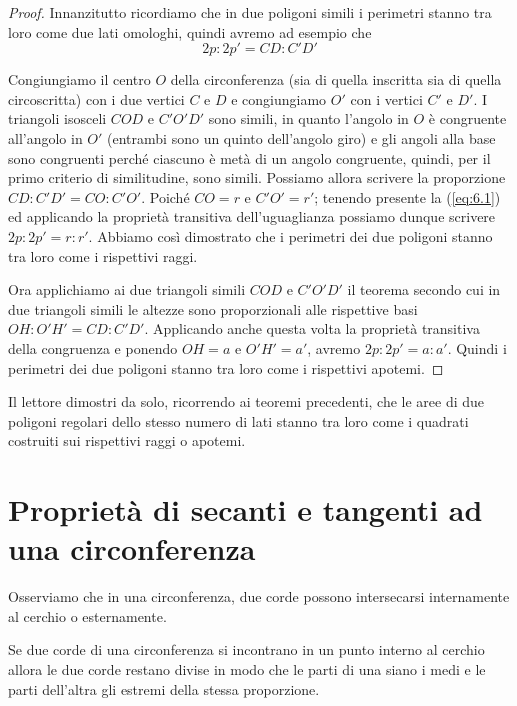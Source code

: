 \begin{proof}
Innanzitutto ricordiamo che in due poligoni simili i perimetri stanno 
tra loro come due lati omologhi, quindi avremo ad esempio che
\begin{equation}\label{eq:6.1}
2p : 2p' = CD : C'D'
\end{equation}

Congiungiamo il centro \(O\) della circonferenza (sia di quella 
inscritta sia di quella circoscritta) con i due vertici \(C\) e \(D\) e 
congiungiamo \(O'\) con i vertici \(C'\) e \(D'\). I triangoli isosceli 
\(COD\) e \(C'O'D'\) sono simili, in quanto l'angolo in \(O\) è congruente 
all'angolo in \(O'\) (entrambi sono un quinto dell'angolo giro) e gli 
angoli alla base sono congruenti perché ciascuno è metà di un angolo 
congruente, quindi, per il primo criterio di similitudine, sono 
simili. Possiamo allora scrivere la proporzione \(CD : C'D' = CO : 
C'O'\).
Poiché \(CO = r\) e \(C'O' = r'\); tenendo presente la (\ref{eq:6.1}) ed 
applicando la proprietà transitiva dell'uguaglianza possiamo dunque 
scrivere \(2p : 2p' = r : r'\). Abbiamo così dimostrato che i perimetri 
dei due poligoni stanno tra loro come i rispettivi raggi.

Ora applichiamo ai due triangoli simili \(COD\) e \(C'O'D'\) il teorema 
secondo cui in due triangoli simili le altezze sono proporzionali 
alle rispettive basi \(OH : O'H' = CD : C'D'\). Applicando anche questa 
volta la proprietà transitiva della congruenza e ponendo \(OH = a\) e 
\(O'H' =a'\), avremo \(2p : 2p' = a : a'\).
Quindi i perimetri dei due poligoni stanno tra loro come i rispettivi 
apotemi.
\end{proof}

Il lettore dimostri da solo, ricorrendo ai teoremi precedenti, che le 
aree di due poligoni regolari dello stesso numero di lati stanno tra 
loro come i quadrati costruiti sui rispettivi raggi o apotemi.


\section{Proprietà di secanti e tangenti ad una 
circonferenza}\label{sect:proprieta_secanti_tangenti}

Osserviamo che in una circonferenza, due corde possono intersecarsi 
internamente al cerchio o esternamente.
\begin{teorema}
Se due corde di una circonferenza si incontrano in un punto interno 
al cerchio allora le due corde restano divise in modo che le parti di 
una siano i medi e le parti dell'altra gli estremi della stessa 
proporzione.
\end{teorema}

